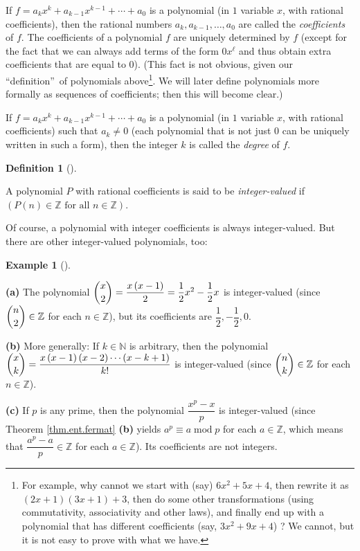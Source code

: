 \documentclass[numbers=enddot,12pt,final,onecolumn,notitlepage]{scrartcl}%
\numberwithin{exer}{subsection}
\theoremstyle{definition}
\newtheorem{defi}[theo]{Definition}
\newenvironment{definition}[1][]
{\begin{defi}[#1]\begin{leftbar}}
{\end{leftbar}\end{defi}}
\newtheorem{exam}[theo]{Example}
\newenvironment{example}[1][]
{\begin{exam}[#1]\begin{leftbar}}
{\end{leftbar}\end{exam}}
\begin{document}
If $f=a_{k}x^{k}+a_{k-1}x^{k-1}+\cdots+a_{0}$ is a polynomial (in $1$ variable
$x$, with rational coefficients), then the rational numbers $a_{k}%
,a_{k-1},\ldots,a_{0}$ are called the \textit{coefficients} of $f$. The
coefficients of a polynomial $f$ are uniquely determined by $f$ (except for
the fact that we can always add terms of the form $0x^{\ell}$ and thus obtain
extra coefficients that are equal to $0$). (This fact is not obvious, given
our \textquotedblleft definition\textquotedblright\ of polynomials
above\footnote{For example, why cannot we start with (say) $6x^{2}+5x+4$, then
rewrite it as $\left(  2x+1\right)  \left(  3x+1\right)  +3$, then do some
other transformations (using commutativity, associativity and other laws), and
finally end up with a polynomial that has different coefficients (say,
$3x^{2}+9x+4$) ? We cannot, but it is not easy to prove with what we have.}.
We will later define polynomials more formally as sequences of coefficients;
then this will become clear.)

If $f=a_{k}x^{k}+a_{k-1}x^{k-1}+\cdots+a_{0}$ is a polynomial (in $1$ variable
$x$, with rational coefficients) such that $a_{k}\neq0$ (each polynomial that
is not just $0$ can be uniquely written in such a form), then the integer $k$
is called the \textit{degree} of $f$.

\begin{definition}
\label{def.ivp.ivp}A polynomial $P$ with rational coefficients is said to be
\textit{integer-valued} if $\left(  P\left(  n\right)  \in\mathbb{Z}\text{ for
all }n\in\mathbb{Z}\right)  $.
\end{definition}

Of course, a polynomial with integer coefficients is always integer-valued.
But there are other integer-valued polynomials, too:

\begin{example}
\label{exa.ivp.ivps1}\textbf{(a)} The polynomial $\dbinom{x}{2}=\dfrac
{x\left(  x-1\right)  }{2}=\dfrac{1}{2}x^{2}-\dfrac{1}{2}x$ is integer-valued
(since $\dbinom{n}{2}\in\mathbb{Z}$ for each $n\in\mathbb{Z}$), but its
coefficients are $\dfrac{1}{2},-\dfrac{1}{2},0$.

\textbf{(b)} More generally: If $k\in\mathbb{N}$ is arbitrary, then the
polynomial $\dbinom{x}{k}=\dfrac{x\left(  x-1\right)  \left(  x-2\right)
\cdots\left(  x-k+1\right)  }{k!}$ is integer-valued (since $\dbinom{n}{k}%
\in\mathbb{Z}$ for each $n\in\mathbb{Z}$).

\textbf{(c)} If $p$ is any prime, then the polynomial $\dfrac{x^{p}-x}{p}$ is
integer-valued (since Theorem \ref{thm.ent.fermat} \textbf{(b)} yields
$a^{p}\equiv a\operatorname{mod}p$ for each $a\in\mathbb{Z}$, which means that
$\dfrac{a^{p}-a}{p}\in\mathbb{Z}$ for each $a\in\mathbb{Z}$). Its coefficients
are not integers.
\end{example}
\end{document}
